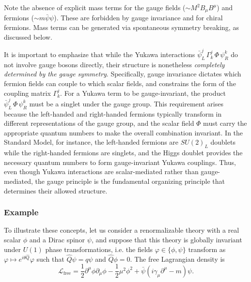 Note the absence of explicit mass terms for the gauge fields ($\sim M^2 B_\mu B^\mu$) and fermions ($\sim m \bar{\psi}\psi$). These are forbidden by gauge invariance and for chiral fermions. Mass terms can be generated via spontaneous symmetry breaking, as discussed below.

It is important to emphasize that while the Yukawa interactions $\bar{\psi}_L^j \, \Gamma^j_k \, \Phi \, \psi_R^k$ do not involve gauge bosons directly, their structure is nonetheless \textit{completely determined by the gauge symmetry}. Specifically, gauge invariance dictates which fermion fields can couple to which scalar fields, and constrains the form of the coupling matrix $\Gamma^j_k$. For a Yukawa term to be gauge-invariant, the product $\bar{\psi}_L^j \, \Phi \, \psi_R^k$ must be a singlet under the gauge group. This requirement arises because the left-handed and right-handed fermions typically transform in different representations of the gauge group, and the scalar field $\Phi$ must carry the appropriate quantum numbers to make the overall combination invariant. In the Standard Model, for instance, the left-handed fermions are $SU(2)_L$ doublets while the right-handed fermions are singlets, and the Higgs doublet provides the necessary quantum numbers to form gauge-invariant Yukawa couplings. Thus, even though Yukawa interactions are scalar-mediated rather than gauge-mediated, the gauge principle is the fundamental organizing principle that determines their allowed structure.

\subsubsection{Example}
To illustrate these concepts, let us consider a renormalizable theory with a real scalar $\phi$ and a Dirac spinor $\psi$, and suppose that this theory is globally invariant under $U(1)$ phase transformations, i.e. the fields $\varphi\in\{\phi,\psi\}$ transform as $\varphi\mapsto e^{i\theta \hat Q}\varphi $ such that $\hat Q \psi = q \psi$ and $\hat Q \phi=0$. The free Lagrangian density is
\begin{equation}
	\mathcal L_{\text{free}}=\frac{1}{2} \partial^{\mu} \phi \partial_{\mu} \phi-\frac{1}{2}\mu^2\phi^2+\bar{\psi}(i \gamma_\mu  \partial^\mu-m) \psi.
\end{equation}

